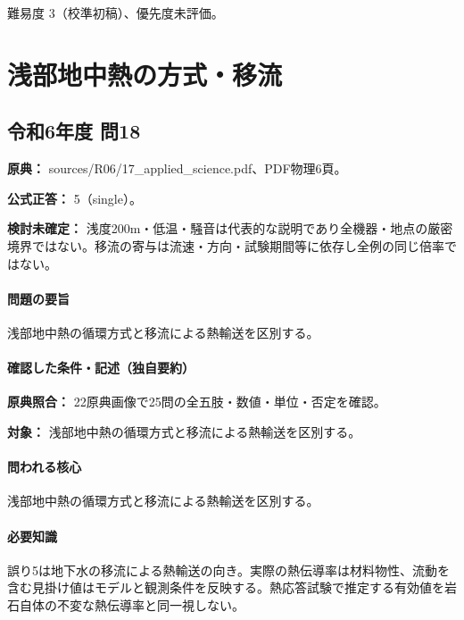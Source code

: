\par 難易度 3（校準初稿）、優先度未評価。

\section{浅部地中熱の方式・移流}

\subsection{令和6年度 問18}
\label{q:r06-reg-applied-18}

\noindent\textbf{原典：} sources/R06/17\_applied\_science.pdf、PDF物理6頁。

\textbf{公式正答：} 5（single）。

\par\textbf{検討未確定：} 浅度200m・低温・騒音は代表的な説明であり全機器・地点の厳密境界ではない。移流の寄与は流速・方向・試験期間等に依存し全例の同じ倍率ではない。

\paragraph{問題の要旨} 浅部地中熱の循環方式と移流による熱輸送を区別する。

\paragraph{確認した条件・記述（独自要約）}\mbox{}\par

\noindent\textbf{原典照合：} 22原典画像で25問の全五肢・数値・単位・否定を確認。\par

\noindent\textbf{対象：} 浅部地中熱の循環方式と移流による熱輸送を区別する。\par

\paragraph{問われる核心} 浅部地中熱の循環方式と移流による熱輸送を区別する。

\paragraph{必要知識} 誤り5は地下水の移流による熱輸送の向き。実際の熱伝導率は材料物性、流動を含む見掛け値はモデルと観測条件を反映する。熱応答試験で推定する有効値を岩石自体の不変な熱伝導率と同一視しない。

